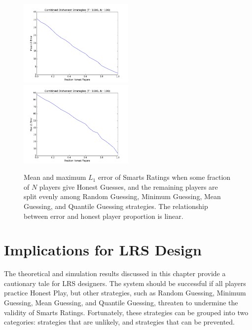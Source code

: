 \begin{figure}[H]
\centerline{%
\includegraphics[width=0.5\textwidth]{figures/robustness/Combined_Dishonest_Strategies31.png}
\includegraphics[width=0.5\textwidth] {figures/robustness/Combined_Dishonest_Strategies32.png}%
}%
\caption{Mean and maximum $L_1$ error of Smarts Ratings when some fraction of $N$ players give Honest Guesses, and the remaining players are split evenly among Random Guessing, Minimum Guessing, Mean Guessing, and Quantile Guessing strategies. The relationship between error and honest player proportion is linear.}
\label{fig:Combined}
\end{figure}
\section{Implications for LRS Design}

The theoretical and simulation results discussed in this chapter provide a cautionary tale for LRS designers. The system should be successful if all players practice Honest Play, but other strategies, such as Random Guessing, Minimum Guessing, Mean Guessing, and Quantile Guessing, threaten to undermine the validity of Smarts Ratings. Fortunately, these strategies can be grouped into two categories: strategies that are unlikely, and strategies that can be prevented. 

